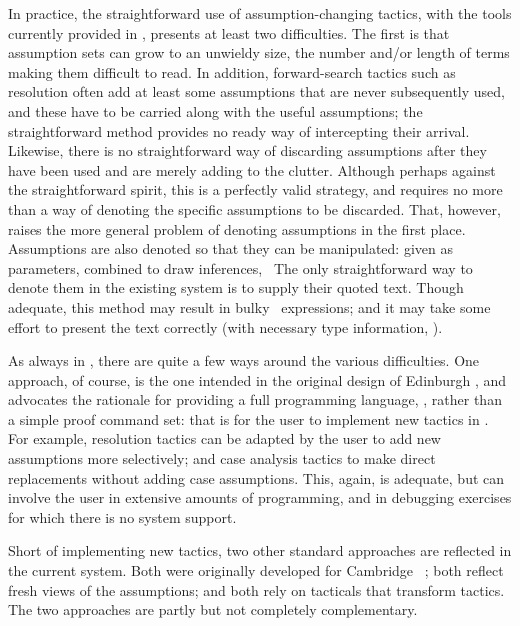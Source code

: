 In practice, the straightforward use of assumption-changing
tactics,
with the tools currently provided in \HOL, presents at
least two difficulties.  The first is that assumption sets can grow to an
unwieldy size, the number and/or length of terms making them difficult to
read.  In addition, forward-search tactics such as resolution often add at least
some assumptions that are never subsequently used, and these have to be
carried along with the useful assumptions; the straightforward
method provides no ready way of intercepting their arrival.
Likewise, there is no straightforward way of discarding
assumptions after they have been used and are merely adding to the clutter.
Although perhaps against the straightforward spirit, this is a perfectly valid
strategy, and
requires no more than a way of denoting
the specific assumptions to be discarded. That, however,
raises the more general problem of denoting assumptions in the first place.
Assumptions are also denoted
so that they can be
manipulated: given as parameters, combined to draw inferences, \etc\  The only
straightforward way to denote them in the existing system is to supply
their quoted text.  Though adequate, this
method may result in bulky \ML\ expressions; and it may take some effort to present the text
correctly (with necessary type information, \etc).

As always in \HOL, there are quite a few ways around the various difficulties.
One approach, of course, is the one intended in the original
design of Edinburgh \LCF,
and advocates the rationale for providing a full programming language, \ML,
rather than a simple proof command set: that is for the user to
implement new tactics in \ML.  For example, resolution tactics can be adapted
by the user to add new assumptions more selectively; and case analysis tactics
to make direct replacements without adding case assumptions.
This, again, is adequate, but can involve the user in extensive amounts of
programming, and in debugging exercises for which there is no
system support.

Short of implementing new tactics, two other standard
approaches are reflected in the current system.  Both were originally
developed for Cambridge \LCF\ \cite{lcp_rewrite,new-LCF-man}; both reflect
fresh views of the assumptions; and both rely on tacticals that transform
tactics.  The two approaches are
partly but not completely complementary.

